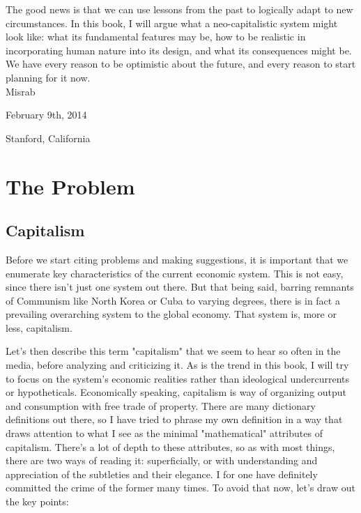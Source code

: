 \documentclass[12pt]{memoir}
\begin{document}
		The good news is that we can use lessons from the past to logically adapt to new circumstances. In this book, I will argue what a neo-capitalistic system might look like: what its fundamental features may 
		be, how to be realistic in incorporating human nature into its design, and what its consequences might be. We have every reason to be optimistic about the future, and every reason to start planning for it now.\\
	
		\hfill	Misrab
		
		\hfill	February 9th, 2014
		
		\hfill	Stanford, California
		
		
	\chapter{The Problem}
		\section{Capitalism}
			Before we start citing problems and making suggestions, it is important that we enumerate key characteristics of the current economic system. This is not easy, since there isn't just 
			one system out there. But that being said, barring remnants of Communism like North Korea or Cuba to varying degrees, there is in fact a prevailing overarching system to the global economy. That 
			system is, more or less, capitalism.\
			
			Let's then describe this term "capitalism" that we seem to hear so often in the media, before analyzing and criticizing it. As is the trend in this book, I will try to focus on the system's economic 
			realities rather than ideological undercurrents or hypotheticals. Economically speaking, capitalism is way of organizing output and consumption with free trade of property. There are many dictionary 
			definitions out there, so I have tried to phrase my own definition in a way that draws attention to what I see as the minimal "mathematical" attributes of capitalism. There's a lot of depth to these attributes, so as 
			with most things, there are two ways of reading it: superficially, or with understanding and appreciation of the subtleties and their elegance. I for one have definitely committed 
			the crime of the former many times. To avoid that now, let's draw out the key points:
			
\end{document}
